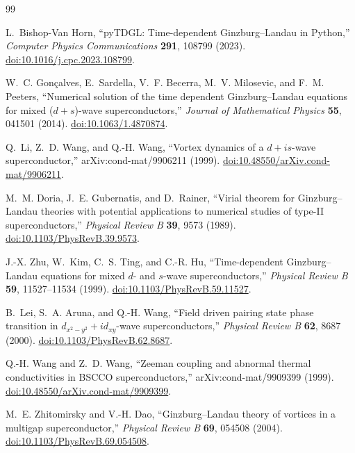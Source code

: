 \documentclass[11pt]{article}
\begin{document}
\begin{thebibliography}{99}

L.~Bishop-Van Horn,
``pyTDGL: Time-dependent Ginzburg--Landau in Python,''
\textit{Computer Physics Communications} \textbf{291}, 108799 (2023).
\href{https://doi.org/10.1016/j.cpc.2023.108799}{doi:10.1016/j.cpc.2023.108799}.

W.~C. Gon\c{c}alves, E.~Sardella, V.~F. Becerra, M.~V. Milosevic,
and F.~M. Peeters,
``Numerical solution of the time dependent Ginzburg--Landau equations for
mixed ($d+s$)-wave superconductors,''
\textit{Journal of Mathematical Physics} \textbf{55}, 041501 (2014).
\href{https://doi.org/10.1063/1.4870874}{doi:10.1063/1.4870874}.

Q.~Li, Z.~D. Wang, and Q.-H. Wang,
``Vortex dynamics of a $d+is$-wave superconductor,''
arXiv:cond-mat/9906211 (1999).
\href{https://doi.org/10.48550/arXiv.cond-mat/9906211}{doi:10.48550/arXiv.cond-mat/9906211}.

M.~M. Doria, J.~E. Gubernatis, and D.~Rainer,
``Virial theorem for Ginzburg--Landau theories with potential applications to
numerical studies of type-II superconductors,''
\textit{Physical Review B} \textbf{39}, 9573 (1989).
\href{https://doi.org/10.1103/PhysRevB.39.9573}{doi:10.1103/PhysRevB.39.9573}.

J.-X. Zhu, W.~Kim, C.~S. Ting, and C.-R. Hu,
``Time-dependent Ginzburg--Landau equations for mixed $d$- and $s$-wave
superconductors,''
\textit{Physical Review B} \textbf{59}, 11527--11534 (1999).
\href{https://doi.org/10.1103/PhysRevB.59.11527}{doi:10.1103/PhysRevB.59.11527}.

B.~Lei, S.~A. Aruna, and Q.-H. Wang,
``Field driven pairing state phase transition in
$d_{x^2-y^2}+id_{xy}$-wave superconductors,''
\textit{Physical Review B} \textbf{62}, 8687 (2000).
\href{https://doi.org/10.1103/PhysRevB.62.8687}{doi:10.1103/PhysRevB.62.8687}.

Q.-H. Wang and Z.~D. Wang,
``Zeeman coupling and abnormal thermal conductivities in BSCCO
superconductors,''
arXiv:cond-mat/9909399 (1999).
\href{https://doi.org/10.48550/arXiv.cond-mat/9909399}{doi:10.48550/arXiv.cond-mat/9909399}.

M.~E. Zhitomirsky and V.-H. Dao,
``Ginzburg--Landau theory of vortices in a multigap superconductor,''
\textit{Physical Review B} \textbf{69}, 054508 (2004).
\href{https://doi.org/10.1103/PhysRevB.69.054508}{doi:10.1103/PhysRevB.69.054508}.


\end{thebibliography}
\end{document}
